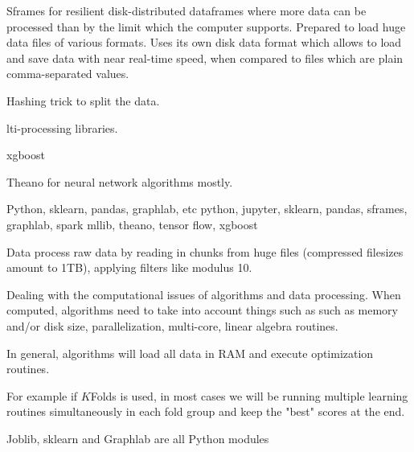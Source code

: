\documentclass{article}%
\theoremstyle{definition}
\begin{document}
Sframes for resilient disk-distributed dataframes where more data can be processed than by the limit which the computer supports. Prepared to load huge data files of various formats. Uses its own disk data format which allows to load and save data with near real-time speed, when compared to files which are plain comma-separated values.

Hashing trick to split the data.


lti-processing libraries.

xgboost

Theano for neural network algorithms mostly.


Python, sklearn, pandas, graphlab, etc
python, jupyter, sklearn, pandas, sframes, graphlab, spark mllib, theano, tensor flow, xgboost

Data process raw data by reading in chunks from huge files (compressed filesizes amount to 1TB), applying filters like modulus 10.

Dealing with the computational issues of algorithms and data processing. When computed, algorithms need to take into account things such as such as memory and/or disk size, parallelization, multi-core, linear algebra routines.

In general, algorithms will load all data in RAM and execute optimization routines. 

For example if $K$Folds is used, in most cases we will be running multiple  learning routines simultaneously in each fold group and keep the "best" scores at the end.

Joblib, sklearn and Graphlab are all Python modules
\end{document}
